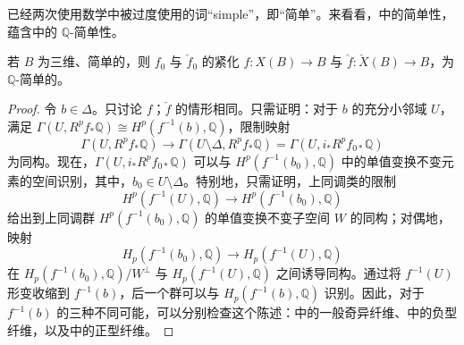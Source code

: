 已经两次使用数学中被过度使用的词“simple”，即“简单”。来看看，中的简单性，蕴含中的 $\mathbb Q$-简单性。

\begin{proposition}\label{prop:6.102}
若 $B$ 为三维、简单的，则 $f_0$ 与 $\check f_0$ 的紧化 $f\colon X(B)\to B$ 与 $\check f\colon\check X(B)\to B$，为 $\mathbb Q$-简单的。
\end{proposition}
\begin{proof}
令 $b\in\Delta$。只讨论 $f$；$\check f$ 的情形相同。只需证明：对于 $b$ 的充分小邻域 $U$，满足 $\Gamma(U,R^pf_*\mathbb Q)\cong H^p(f^{-1}(b),\mathbb Q)$，限制映射
\[
\Gamma(U,R^pf_*\mathbb Q)\longrightarrow
\Gamma(U\setminus\Delta,R^pf_*\mathbb Q)
=\Gamma(U,i_*R^pf_{0*}\mathbb Q)
\]
为同构。现在，$\Gamma(U,i_*R^pf_{0*}\mathbb Q)$ 可以与 $H^p(f^{-1}(b_0),\mathbb Q)$ 中的单值变换不变元素的空间识别，其中，$b_0\in U\setminus\Delta$。特别地，只需证明，上同调类的限制
\[
H^p(f^{-1}(U),\mathbb Q)\longrightarrow H^p(f^{-1}(b_0),\mathbb Q)
\]
给出到上同调群 $H^p(f^{-1}(b_0),\mathbb Q)$ 的单值变换不变子空间 $W$ 的同构；对偶地，映射
\[
H_p(f^{-1}(b_0),\mathbb Q)\longrightarrow H_p(f^{-1}(U),\mathbb Q)
\]
在 $H_p(f^{-1}(b_0),\mathbb Q)/W^\perp$ 与 $H_p(f^{-1}(U),\mathbb Q)$ 之间诱导同构。通过将 $f^{-1}(U)$ 形变收缩到 $f^{-1}(b)$，后一个群可以与 $H_p(f^{-1}(b),\mathbb Q)$ 识别。因此，对于 $f^{-1}(b)$ 的三种不同可能，可以分别检查这个陈述：中的一般奇异纤维、中的负型纤维，以及中的正型纤维。


\end{proof}
